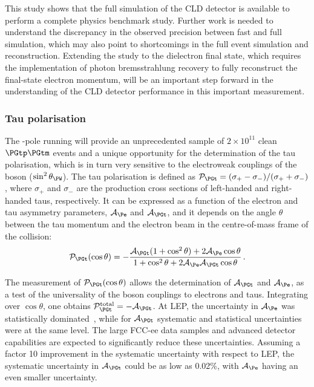 This study shows that the full simulation of the CLD detector is available to perform a complete physics benchmark study. 
Further work is needed to understand the discrepancy in the observed precision between fast and full simulation, 
which may also point to shortcomings in the full event simulation and reconstruction. 
Extending the study to the dielectron final state, which requires the implementation of photon bremsstrahlung recovery to fully reconstruct the final-state electron momentum, 
will be an important step forward in the understanding of the CLD detector performance in this important measurement.

\subsubsection{Tau polarisation}

The \PZ-pole running will provide an unprecedented sample of $2 \times 10^{11}$ clean $\PGtp\PGtm$ events
and a unique opportunity for the determination of the tau polarisation,
which is in turn very sensitive to the electroweak couplings of the \PZ boson ($\sin^2 \theta_{\PW}$). 
The tau polarisation is defined as 
\mbox{$\mathcal{P}_{\PGt} = (\sigma_+ - \sigma_-)/(\sigma_+ + \sigma_-)$}, 
where $\sigma_+$ and $\sigma_-$ are the production cross sections of left-handed and right-handed taus, respectively. 
It can be expressed as a function of the electron and tau asymmetry parameters, $\mathcal{A}_{\Pe}$ and $\mathcal{A}_{\PGt}$, 
and it depends on the angle $\theta$ between the tau momentum and the electron beam in the centre-of-mass frame of the collision:
\begin{equation}
\mathcal{P}_{\PGt}(\cos\theta) = 
- \frac{\mathcal{A}_{\PGt} (1+\cos^2 \theta) + 2 \mathcal{A}_{\Pe} \cos\theta} 
{1+ \cos^2\theta + 2 \mathcal{A}_{\Pe} \mathcal{A}_{\PGt} \cos\theta} \, .
\end{equation}

The measurement of $\mathcal{P}_{\PGt}(\cos\theta)$ allows the determination of $\mathcal{A}_{\PGt}$ and $\mathcal{A}_{\Pe}$, 
as a test of the universality of the \PZ boson couplings to electrons and taus. 
Integrating over $\cos\theta$, one obtains $\mathcal{P}_{\PGt}^\text{total} = -\mathcal{A}_{\PGt}$. 
At LEP, the uncertainty in $\mathcal{A}_{\Pe}$ was statistically dominated~\cite{ALEPH:2005ab}, while for $\mathcal{A}_{\PGt}$ systematic and statistical uncertainties were at the same level. 
The large FCC-ee data samples and advanced detector capabilities are expected to significantly reduce these uncertainties. 
Assuming a factor 10 improvement in the systematic uncertainty with respect to LEP, the systematic uncertainty in $\mathcal{A}_{\PGt}$ could be as low as 0.02\%, 
with $\mathcal{A}_{\Pe}$ having an even smaller uncertainty.

